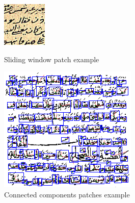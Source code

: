 \documentclass[conference,a4paper]{ieeetran}
\begin{document}
\begin{figure}[!t]
\centering
\begin{minipage}{.45\linewidth}
	\centering
  \includegraphics[height=.7\linewidth]{figures/3.png}
  \caption{Sliding window patch example}
  \label{fig:patches_example_sliding_window}
\end{minipage}
\hspace{.05\linewidth}
\begin{minipage}{.45\linewidth}
	\centering
  \includegraphics[height=.7\linewidth]{figures/patches_example_connected_components_part.png}
  \caption{Connected components patches example}
  \label{fig:patches_example_connected_components}
\end{minipage}
\end{figure}

\end{document}
